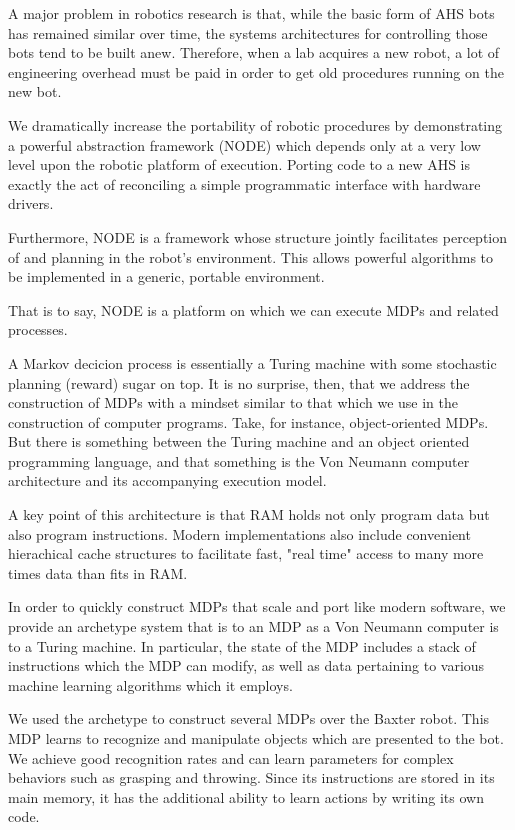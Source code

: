 \documentclass[conference]{IEEEtran}
\begin{document}
A major problem in robotics research is that, while the basic form of AHS bots has remained
similar over time, the systems architectures for controlling those bots tend to be built 
anew. Therefore, when a lab acquires a new robot, a lot of engineering overhead must be paid
in order to get old procedures running on the new bot.

We dramatically increase the portability of robotic procedures by demonstrating a powerful
abstraction framework (NODE) which depends only at a very low level upon the robotic platform
of execution. Porting code to a new AHS is exactly the act of reconciling a simple programmatic
interface with hardware drivers.

Furthermore, NODE is a framework whose structure jointly facilitates perception of 
and planning in the robot's environment. This allows powerful algorithms to be implemented in a
generic, portable environment.

That is to say, NODE is a platform on which we can execute MDPs and related processes.

A Markov decicion process is essentially a Turing machine with some stochastic planning (reward)
sugar on top. It is no surprise, then, that we address the construction of MDPs with a mindset similar
to that which we use in the construction of computer programs. Take, for instance, object-oriented MDPs. But there
is something between the Turing machine and an object oriented programming language, and that
something is the Von Neumann computer architecture and its accompanying execution model.

A key point of this architecture is that RAM holds not only program data but also program instructions.
Modern implementations also include convenient hierachical cache structures to facilitate fast,
"real time" access to many more times data than fits in RAM.

In order to quickly construct MDPs that scale and port like modern software, we provide an
archetype system that is to an MDP as a Von Neumann computer is to a Turing machine.
In particular, the state of the MDP includes a stack of instructions which the MDP
can modify, as well as data pertaining to various machine learning algorithms which it employs.

We used the archetype to construct several MDPs over the Baxter robot. This MDP learns to recognize and manipulate
objects which are presented to the bot. We achieve good recognition rates and can learn parameters 
for complex behaviors such as grasping and throwing. Since its instructions are stored in its main memory, 
it has the additional ability to learn actions by writing its own code.
\end{document}
